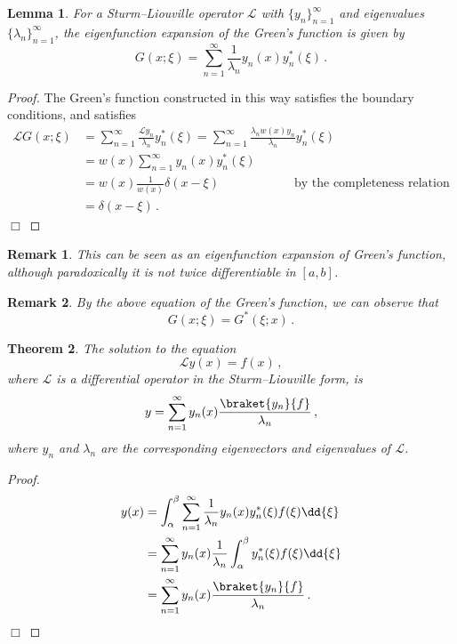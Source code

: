 \documentclass{article}
\theoremstyle{plain}\theoremheaderfont{\normalfont\itshape}\theorembodyfont{\rmfamily}\theoremseparator{.}\newtheorem*{rem}{Remark}\newtheorem*{ex}{Example}\newtheorem*{proof}{Proof}\newtheorem*{altp}{Alternative proof}
\theoremstyle{plain}\theoremheaderfont{\normalfont\bfseries}\theorembodyfont{\rmfamily}\theoremseparator{.}\newtheorem{thm}{Theorem}[section]\newtheorem{lem}[thm]{Lemma}\newtheorem{prop}[thm]{Proposition}\newtheorem*{cor}{Corollary}\newtheorem{defn}[thm]{Definition}\newtheorem{clm}[thm]{Claim}\newtheorem{clminproof}{Claim}
\theoremstyle{break}\theoremheaderfont{\normalfont\itshape}\theorembodyfont{\rmfamily}\theoremseparator{.\medskip}\newtheorem*{proofskip}{Proof}\newtheorem*{exs}{Examples}\newtheorem*{rems}{Remarks}
\theoremstyle{break}\theoremheaderfont{\normalfont\bfseries}\theorembodyfont{\rmfamily}\theoremseparator{.\medskip}\newtheorem{lemskip}[thm]{Lemma}\newtheorem{defnskip}[thm]{Definition}\newtheorem{propskip}[thm]{Proposition}\newtheorem{thmskip}[thm]{Theorem}
\numberwithin{equation}{section}
\newcommand{\qed}{\hfill\ensuremath{\Box}}
\begin{document}
	\begin{lem}
		For a Sturm--Liouville operator \(\mathcal{L}\) with \(\{y_n\}_{n=1}^{\infty}\) and eigenvalues \(\{\lambda_n\}_{n=1}^{\infty}\), the eigenfunction expansion of the Green's function is given by
		\[G(x;\xi)=\sum_{n=1}^{\infty}\frac{1}{\lambda_n}y_n(x)y_n^*(\xi)\,.\]
	\end{lem}

	\begin{proof}
		The Green's function constructed in this way satisfies the boundary conditions, and satisfies
		\begin{align*}
			\mathcal{L}G(x;\xi)&=\sum_{n=1}^{\infty}\frac{\mathcal{L}y_n}{\lambda_n}y_n^*(\xi)=\sum_{n=1}^{\infty}\frac{\lambda_n w(x)y_n}{\lambda_n}y_n^*(\xi)\\
			&=w(x)\sum_{n=1}^{\infty}y_n(x)y_n^*(\xi)\\
			&=w(x)\frac{1}{w(x)}\delta(x-\xi) \qquad\qquad\qquad\text{by the completeness relation}\\
			&=\delta(x-\xi)\,.
		\end{align*}\qed
	\end{proof}
	\begin{rem}
		This can be seen as an eigenfunction expansion of Green's function, although paradoxically it is not twice differentiable in \([a,b]\).
	\end{rem}
	\begin{rem}
		By the above equation of the Green's function, we can observe that
		\[G(x;\xi)=G^*(\xi;x)\,.\]
	\end{rem}

	\begin{thm}
		The solution to the equation
		\[\mathcal{L}y(x)=f(x)\,,\]
		where \(\mathcal{L}\) is a differential operator in the Sturm--Liouville form, is
		\[y=\sum_{n=1}^{\infty}y_n(x)\frac{\braket{y_n}{f}}{\lambda_n}\,,\]
		where \(y_n\) and \(\lambda_n\) are the corresponding eigenvectors and eigenvalues of \(\mathcal{L}\).
	\end{thm}
	\begin{proof}
		\begin{align*}
			y(x)&=\int_{\alpha}^{\beta}\sum_{n=1}^{\infty}\frac{1}{\lambda_n}y_n(x)y_n^*(\xi)f(\xi)\dd{\xi}\\
			&=\sum_{n=1}^{\infty}y_n(x)\frac{1}{\lambda_n}\int_{\alpha}^{\beta}y_n^*(\xi)f(\xi)\dd{\xi}\\
			&=\sum_{n=1}^{\infty}y_n(x)\frac{\braket{y_n}{f}}{\lambda_n}\,.
		\end{align*}\qed
	\end{proof}
\end{document}
